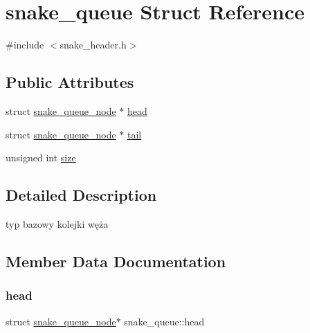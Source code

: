 \hypertarget{structsnake__queue}{}\section{snake\+\_\+queue Struct Reference}
\label{structsnake__queue}


{\ttfamily \#include $<$snake\+\_\+header.\+h$>$}

\subsection*{Public Attributes}
\begin{DoxyCompactItemize}
\item 
struct \mbox{\hyperlink{structsnake__queue__node}{snake\+\_\+queue\+\_\+node}} $\ast$ \mbox{\hyperlink{structsnake__queue_aa9c92f3a2dadd826a37e9230d10df683}{head}}
\item 
struct \mbox{\hyperlink{structsnake__queue__node}{snake\+\_\+queue\+\_\+node}} $\ast$ \mbox{\hyperlink{structsnake__queue_a7d432980209f748e5d916d1fb609dceb}{tail}}
\item 
unsigned int \mbox{\hyperlink{structsnake__queue_a95827ec937e7dce2038a979680b07934}{size}}
\end{DoxyCompactItemize}


\subsection{Detailed Description}
typ bazowy kolejki węża 

\subsection{Member Data Documentation}
\mbox{\label{structsnake__queue_aa9c92f3a2dadd826a37e9230d10df683}} 
\subsubsection{\texorpdfstring{head}{head}}
{\footnotesize\ttfamily struct \mbox{\hyperlink{structsnake__queue__node}{snake\+\_\+queue\+\_\+node}}$\ast$ snake\+\_\+queue\+::head}

\mbox{\label{structsnake__queue_a95827ec937e7dce2038a979680b07934}} 
